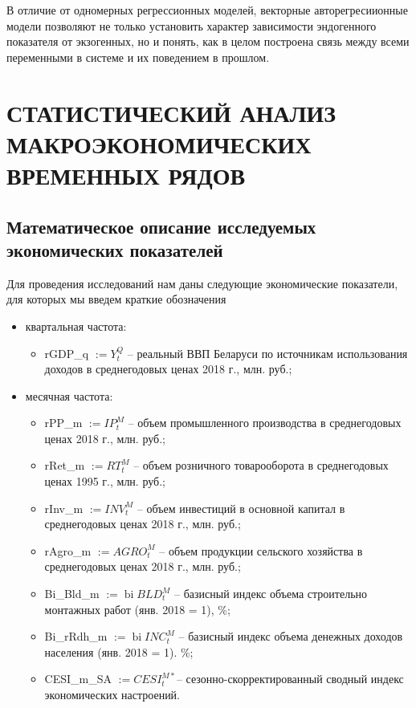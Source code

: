 \documentclass[a4paper, 14pt]{extreport}
\numberwithin{equation}{section}
\newcommand{\bi}{\operatorname{bi}}
\numberwithin{equation}{section}
\begin{document}
	В отличие от одномерных регрессионных моделей, векторные авторегресиионные модели позволяют не только установить характер зависимости эндогенного показателя от экзогенных, но и понять, как в целом построена связь между всеми переменными в системе и их поведением в прошлом.
	
	\newpage
	\chapter{СТАТИСТИЧЕСКИЙ АНАЛИЗ МАКРОЭКОНОМИЧЕСКИХ ВРЕМЕННЫХ РЯДОВ}
	\section{Математическое описание исследуемых экономических показателей}
	
	Для проведения исследований нам даны следующие экономические показатели, для которых мы введем краткие обозначения
	\begin{itemize}
		\item квартальная частота:
		\begin{itemize}
			\item rGDP\_q $:= Y_t^Q$ -- реальный ВВП Беларуси по источникам использования доходов в среднегодовых ценах 2018 г., млн. руб.;
		\end{itemize}
		\item месячная частота:
		\begin{itemize}
			\item rPP\_m $:= IP_t^M$ -- объем промышленного производства в среднегодовых ценах 2018 г., млн. руб.;
			\item rRet\_m $:= RT_t^M$ -- объем розничного товарооборота в среднегодовых ценах 1995 г., млн. руб.;
			\item rInv\_m $:=INV_t^M$ -- объем инвестиций в основной капитал в среднегодовых ценах 2018 г., млн. руб.;
			\item rAgro\_m $:=AGRO_t^M$ -- объем продукции сельского хозяйства в среднегодовых ценах 2018 г., млн. руб.;
			\item Bi\_Bld\_m $:=\bi BLD_t^M$ -- базисный индекс объема строительно монтажных работ (янв. 2018 = 1), \%;
			\item Bi\_rRdh\_m $:=\bi INC_t^M$ -- базисный индекс объема денежных доходов населения (янв. 2018 = 1). \%;
			\item CESI\_m\_SA $:=CESI_t^{M*}$-- сезонно-скорректированный сводный индекс экономических настроений.
		\end{itemize}
	\end{itemize}
	
\end{document}

